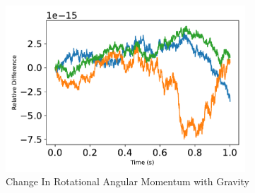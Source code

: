 \begin{figure}[htbp]\centerline{\includegraphics[width=0.8\textwidth]{AutoTeX/ChangeInRotationalAngularMomentum2}}\caption{Change In Rotational Angular Momentum with Gravity}\label{fig:ChangeInRotationalAngularMomentum2}\end{figure}